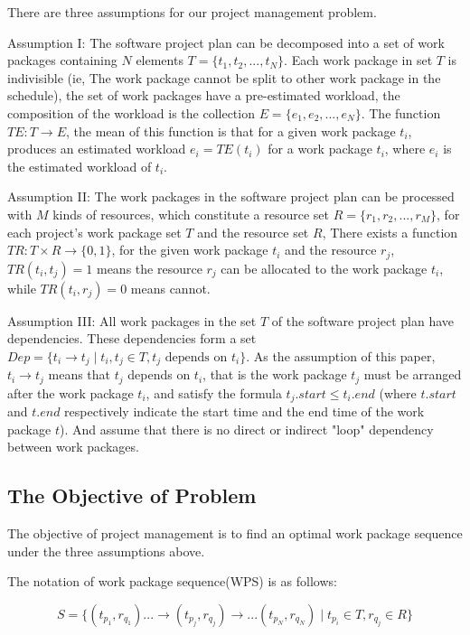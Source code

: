 %
There are three assumptions for our project management problem.


Assumption I: The software project plan can be decomposed into a set of
work packages containing $N$ elements $T = \{t_1, t_2, ..., t_N \}$.
Each work package in set $T$ is indivisible (ie, The work package cannot be
split to other work package in the schedule), the set of work packages have a
pre-estimated workload, the composition of the workload is the collection
$E = \{e _1, e_2, ..., e_N \}$. The function $TE: T \rightarrow E$,
the mean of this function is that for a given work package $t_i$, produces an
estimated workload $e_i = TE(t_i)$ for a work package $t_i$, where $e_i$ is the
estimated workload of $t_i$.


Assumption II: The work packages in the software project plan can be
processed with $M$ kinds of resources, which constitute a resource set
$R = \{r_1, r_2, ..., r_M \}$, for each project's work package set $T$ and the
resource set $R$, There exists a function $TR: T \times R \rightarrow \{0, 1\}$,
for the given work package $t_i$ and the resource $r_j$, $TR(t_i, t_j) = 1$
means the resource $r_j$ can be allocated to the work package $t_i$, while
$TR(t_i, r_j) = 0$ means cannot.


Assumption III: All work packages in the set $T$ of the software project
plan have dependencies. These dependencies form a set
$Dep= \{t_i \rightarrow t_j \mid t_i, t_j \in T, t_j \text{ depends on } t_i\}$.
As the assumption of this paper, $t_i \rightarrow t_j$ means that $t_j$ depends
on $t_i$, that is the work package $t_j$ must be arranged after the work
package $t_i$, and satisfy the formula $t_j.start \leq t_i.end$ (where $t.start$
and $t.end$ respectively indicate the start time and the end time of the work
package $t$).  And assume that there is no direct or indirect "loop" dependency
between work packages.


\subsection{The Objective of Problem}
%
The objective of project management is to find an optimal work package sequence
under the three assumptions above.

The notation of work package sequence(WPS) is as follows:

\begin{equation}
  S = \{
  (t_{p_1}, r_{q_1}) ... \rightarrow (t_{p_j}, r_{q_j}) \rightarrow ... (t_{p_N}, r_{q_N})
  \mid t_{p_i} \in T, r_{q_j} \in R
  \}
  \label{wps}
\end{equation}

